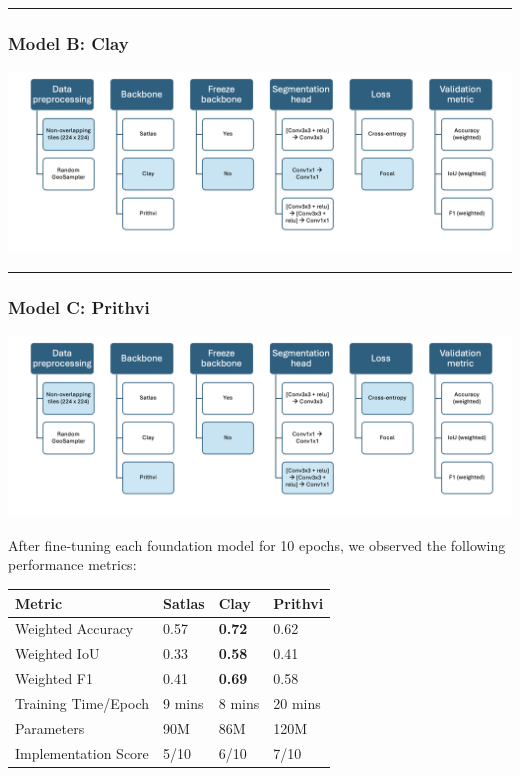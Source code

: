 \documentclass[
  letterpaper,
  DIV=11,
  numbers=noendperiod]{scrartcl}
\begin{document}
\begin{center}\rule{0.5\linewidth}{0.5pt}\end{center}

\subsubsection{Model B: Clay}\label{model-b-clay}

\begin{center}
\includegraphics[width=6.25in,height=\textheight]{../figures/algo_design/clay_model.png}
\end{center}

\begin{center}\rule{0.5\linewidth}{0.5pt}\end{center}

\subsubsection{Model C: Prithvi}\label{model-c-prithvi}

\begin{center}
\includegraphics[width=6.25in,height=\textheight]{../figures/algo_design/prithvi_model.png}
\end{center}

After fine-tuning each foundation model for 10 epochs, we observed the
following performance metrics:

\begin{longtable}[]{@{}llll@{}}
\toprule\noalign{}
Metric & Satlas & Clay & Prithvi \\
\midrule\noalign{}
\endhead
\bottomrule\noalign{}
\endlastfoot
Weighted Accuracy & 0.57 & \textbf{0.72} & 0.62 \\
Weighted IoU & 0.33 & \textbf{0.58} & 0.41 \\
Weighted F1 & 0.41 & \textbf{0.69} & 0.58 \\
Training Time/Epoch & 9 mins & 8 mins & 20 mins \\
Parameters & 90M & 86M & 120M \\
Implementation Score & 5/10 & 6/10 & 7/10 \\
\end{longtable}
\end{document}

